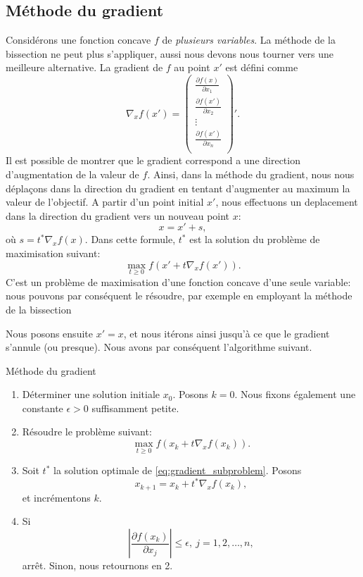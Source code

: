 \subsection{Méthode du gradient}

Considérons une fonction concave $f$ de {\sl plusieurs variables}. La méthode de la bissection ne peut plus s'appliquer, aussi nous devons nous tourner vers une meilleure alternative.
La gradient de $f$ au point $x'$ est défini comme
\[
\nabla_x f(x') = \begin{pmatrix}
\frac{\partial f(x)}{\partial x_1} \\
\frac{\partial f(x')}{\partial x_2} \\
\vdots \\
\frac{\partial f(x')}{\partial x_n} \\
\end{pmatrix}'.
\]
Il est possible de montrer que le gradient correspond a une direction d'augmentation de la valeur de $f$.
Ainsi, dans la méthode du gradient, nous nous déplaçons dans la direction du gradient en tentant d'augmenter au maximum la valeur de l'objectif.
A partir d'un point initial $x'$, nous effectuons un deplacement dans la direction du gradient vers un nouveau point $x$:
\[
x = x'+s,
\]
où $s = t^*\nabla_x f(x)$.
Dans cette formule, $t^*$ est la solution du problème de maximisation suivant:
\[
\max_{t \geq 0} f(x'+t\nabla_x f(x')).
\]
C'est un problème de maximisation d'une fonction concave d'une seule variable: nous pouvons par conséquent le résoudre, par exemple en employant la méthode de la bissection

Nous posons ensuite $x'=x$, et nous itérons ainsi jusqu'à ce que le gradient s'annule (ou presque).
Nous avons par conséquent l'algorithme suivant.
\begin{algo}{Méthode du gradient}
\begin{enumerate}
\item Déterminer une solution initiale $x_0$. Posons $k = 0$. Nous fixons également une constante $\epsilon > 0$ suffisamment petite.
\item Résoudre le problème suivant:
\begin{equation}
\max_{t \geq 0} f(x_k+t\nabla_x f(x_k)).
\label{eq:gradient_subproblem}
\end{equation}
\item
Soit $t^*$ la solution optimale de \eqref{eq:gradient_subproblem}. Posons
\[
x_{k+1} = x_k+t^* \nabla_x f(x_k),
\]
et incrémentons $k$.
\item
Si
\[
\left| \frac{\partial f(x_k)}{\partial x_j} \right| \leq \epsilon,\ j =1,2,\ldots,n,
\]
arrêt. Sinon, nous retournons en 2.
\end{enumerate}
\end{algo}


